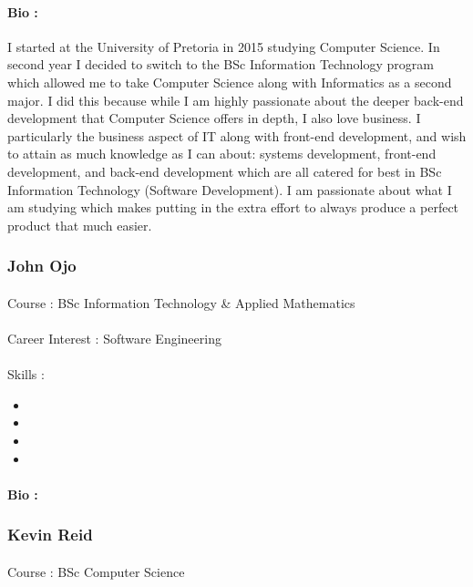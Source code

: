 \documentclass[11pt]{article}
\begin{document}
\paragraph{Bio :}I started at the University of Pretoria in 2015 studying Computer Science. In second year I decided to switch to the BSc Information Technology program which allowed me to take Computer Science along with Informatics as a second major. I did this because while I am highly passionate about the deeper back-end development that Computer Science offers in depth, I also love business. I particularly the business aspect of IT along with front-end development, and wish to attain as much knowledge as I can about: systems development, front-end development, and back-end development which are all catered for best in BSc Information Technology (Software Development). I am passionate about what I am studying which makes putting in the extra effort to always produce a perfect product that much easier. 

\subsubsection{John Ojo}
\paragraph{}Course : BSc Information Technology \& Applied Mathematics
\paragraph{}Career Interest : Software Engineering
\paragraph{}Skills : 
\begin{itemize}
\item 
\item 
\item 
\item 
\end{itemize}
\paragraph{Bio :}

\subsubsection{Kevin Reid}
\paragraph{}Course : BSc Computer Science
\end{document}
